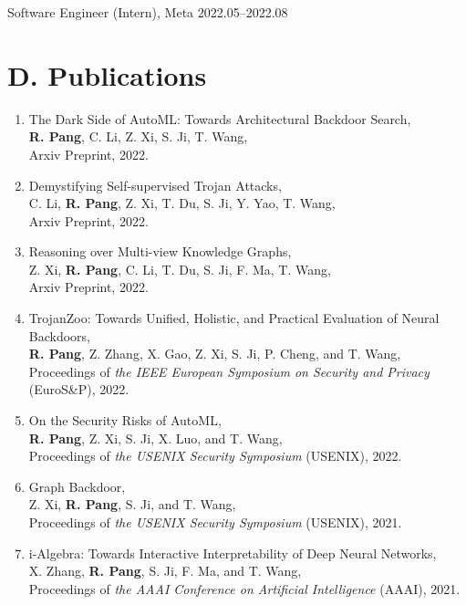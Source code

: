 \documentclass{resume}
\begin{document}
\begin{resume}
Software Engineer (Intern), Meta  \hfill 2022.05--2022.08


\vspace{0.2in} 
\section{D. Publications}
\vspace{24pt}

\begin{enumerate}[labelsep=15pt, parsep=8pt, resume]

\item The Dark Side of AutoML: Towards Architectural Backdoor Search,\\
\textbf{R. Pang}, C. Li, Z. Xi, S. Ji, T. Wang,\\
Arxiv Preprint, 2022.

\item Demystifying Self-supervised Trojan Attacks,\\
C. Li, \textbf{R. Pang}, Z. Xi, T. Du, S. Ji, Y. Yao, T. Wang,\\
Arxiv Preprint, 2022.

\item Reasoning over Multi-view Knowledge Graphs,\\
Z. Xi, \textbf{R. Pang}, C. Li, T. Du, S. Ji, F. Ma, T. Wang,\\
Arxiv Preprint, 2022.

\item TrojanZoo: Towards Unified, Holistic, and Practical Evaluation of Neural Backdoors,\\
\textbf{R. Pang}, Z. Zhang, X. Gao, Z. Xi, S. Ji, P. Cheng, and T. Wang,\\
Proceedings of {\it the IEEE European Symposium on Security and Privacy} (EuroS\&P), 2022.

\item On the Security Risks of AutoML,\\
\textbf{R. Pang}, Z. Xi, S. Ji, X. Luo, and T. Wang,\\
Proceedings of {\it the USENIX Security Symposium} (USENIX), 2022.

\item Graph Backdoor,\\
Z. Xi, \textbf{R. Pang}, S. Ji, and T. Wang,\\
Proceedings of {\it the USENIX Security Symposium} (USENIX), 2021.

\item i-Algebra: Towards Interactive Interpretability of Deep Neural Networks,\\
X. Zhang, \textbf{R. Pang}, S. Ji, F. Ma, and T. Wang,\\
Proceedings of {\it the AAAI Conference on Artificial Intelligence} (AAAI), 2021.


\end{enumerate}
\end{resume}
\end{document}
